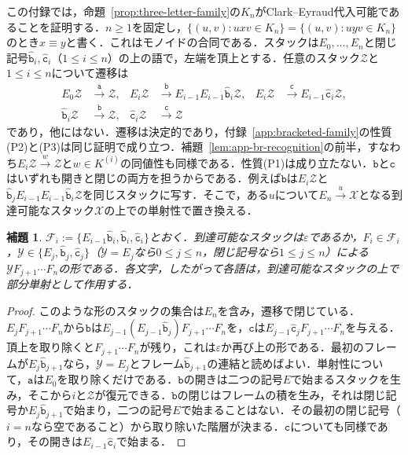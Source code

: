 \documentclass[11pt,a4paper]{ltjsarticle}
\numberwithin{equation}{section}
\theoremstyle{plain}
\newtheorem{lemma}[theorem]{補題}
\theoremstyle{definition}
\theoremstyle{remark}
\newcommand{\eps}{\varepsilon}
\begin{document}
この付録では，命題~\ref{prop:three-letter-family}の$K_n$がClark--Eyraud代入可能であることを証明する．$n\ge1$を固定し，$\{(u,v):uxv\in K_n\}=\{(u,v):uyv\in K_n\}$のとき$x\equiv y$と書く．これはモノイドの合同である．スタックは$E_0,\ldots,E_n$と閉じ記号$\hat{\mathtt b}_i,\hat{\mathtt c}_i$（$1\le i\le n$）の上の語で，左端を頂上とする．任意のスタック$\mathcal Z$と$1\le i\le n$について遷移は
\[
\begin{aligned}
E_0\mathcal Z&\xrightarrow{\mathtt a}\mathcal Z,&
E_i\mathcal Z&\xrightarrow{\mathtt b}E_{i-1}E_{i-1}\hat{\mathtt b}_i\mathcal Z,&
E_i\mathcal Z&\xrightarrow{\mathtt c}E_{i-1}\hat{\mathtt c}_i\mathcal Z,\\
\hat{\mathtt b}_i\mathcal Z&\xrightarrow{\mathtt b}\mathcal Z,&
\hat{\mathtt c}_i\mathcal Z&\xrightarrow{\mathtt c}\mathcal Z
\end{aligned}
\]
であり，他にはない．遷移は決定的であり，付録~\ref{app:bracketed-family}の性質(P2)と(P3)は同じ証明で成り立つ．補題~\ref{lem:app-br-recognition}の前半，すなわち$E_i\mathcal Z\xrightarrow{w}\mathcal Z$と$w\in K^{(i)}$の同値性も同様である．性質(P1)は成り立たない．$\mathtt b$と$\mathtt c$はいずれも開きと閉じの両方を担うからである．例えば$\mathtt b$は$E_i\mathcal Z$と$\hat{\mathtt b}_jE_{i-1}E_{i-1}\hat{\mathtt b}_i\mathcal Z$を同じスタックに写す．そこで，ある$u$について$E_n\xrightarrow{u}\mathcal X$となる到達可能なスタック$\mathcal X$の上での単射性で置き換える．

\begin{lemma}\label{lem:app-tl-reachable}
$\mathcal F_i:=\{E_{i-1}\hat{\mathtt b}_i,\hat{\mathtt b}_i,\hat{\mathtt c}_i\}$とおく．到達可能なスタックは$\eps$であるか，$F_i\in\mathcal F_i$，$\mathcal Y\in\{E_j,\hat{\mathtt b}_j,\hat{\mathtt c}_j\}$（$\mathcal Y=E_j$なら$0\le j\le n$，閉じ記号なら$1\le j\le n$）による$\mathcal YF_{j+1}\cdots F_n$の形である．各文字，したがって各語は，到達可能なスタックの上で部分単射として作用する．
\end{lemma}

\begin{proof}
このような形のスタックの集合は$E_n$を含み，遷移で閉じている．$E_jF_{j+1}\cdots F_n$から$\mathtt b$は$E_{j-1}(E_{j-1}\hat{\mathtt b}_j)F_{j+1}\cdots F_n$を，$\mathtt c$は$E_{j-1}\hat{\mathtt c}_jF_{j+1}\cdots F_n$を与える．頂上を取り除くと$F_{j+1}\cdots F_n$が残り，これは$\eps$か再び上の形である．最初のフレームが$E_j\hat{\mathtt b}_{j+1}$なら，$\mathcal Y=E_j$とフレーム$\hat{\mathtt b}_{j+1}$の連結と読めばよい．単射性について，$\mathtt a$は$E_0$を取り除くだけである．$\mathtt b$の開きは二つの記号$E$で始まるスタックを生み，そこから$i$と$\mathcal Z$が復元できる．$\mathtt b$の閉じはフレームの積を生み，それは閉じ記号か$E_j\hat{\mathtt b}_{j+1}$で始まり，二つの記号$E$で始まることはない．その最初の閉じ記号（$i=n$なら空であること）から取り除いた階層が決まる．$\mathtt c$についても同様であり，その開きは$E_{i-1}\hat{\mathtt c}_i$で始まる．
\end{proof}
\end{document}
